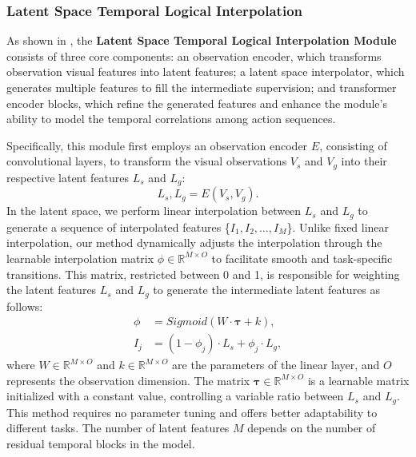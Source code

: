 \subsubsection{Latent Space Temporal Logical Interpolation}
\label{method23}




As shown in , the \textbf{Latent Space Temporal Logical Interpolation Module} consists of three core components: an observation encoder, which transforms observation visual features into latent features; a latent space interpolator, which generates multiple features to fill the intermediate supervision; and transformer encoder blocks, which refine the generated features and enhance the module's ability to model the temporal correlations among action sequences.


Specifically, this module first employs an observation encoder $E$, consisting of convolutional layers, to transform the visual observations $V_s$ and $V_g$ into their respective latent features $L_s$ and $L_g$:
\begin{equation}
    L_s, L_g = E(V_s, V_g).
\end{equation}
In the latent space, we perform linear interpolation between $L_s$ and $L_g$ to generate a sequence of interpolated features \{$I_1, I_2, \dots, I_M$\}. 
Unlike fixed linear interpolation, our method dynamically adjusts the interpolation through the learnable interpolation matrix  $\phi \in \mathbb{R}^{M \times O}$ to facilitate smooth and task-specific transitions. 
This matrix, restricted between 0 and 1, is responsible for weighting the latent features $L_s$ and $L_g$ to generate the intermediate latent features as follows:
\begin{equation}
    \begin{split}
        \phi &= Sigmoid(W \cdot \mathbf{\tau} + k), \\
        I_j &= (1 - \phi_j) \cdot L_s + \phi_j \cdot L_g,
    \end{split}
\end{equation}
where $W \in \mathbb{R}^{M \times O}$ and $k \in \mathbb{R}^{M \times O}$ are the parameters of the linear layer, and $O$ represents the observation dimension. The matrix $\mathbf{\tau} \in \mathbb{R}^{M \times O}$ is a learnable matrix initialized with a constant value, controlling a variable ratio between $L_s$ and $L_g$. This method requires no parameter tuning and offers better adaptability to different tasks. The number of latent features $M$ depends on the number of residual temporal blocks in the model.



